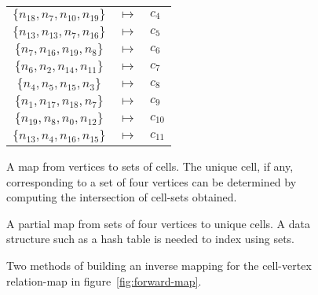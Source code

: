 \begin{figure}[H]
{\begin{tabular}{ccl}
$\{n_{18},n_{7},n_{10},n_{19}\}$ & $\mapsto$ & $c_{4}$ \\
$\{n_{13},n_{13},n_{7},n_{16}\}$ & $\mapsto$ & $c_{5}$ \\
$\{n_{7},n_{16},n_{19},n_{8}\}$ & $\mapsto$ & $c_{6}$ \\
$\{n_{6},n_{2},n_{14},n_{11}\}$ & $\mapsto$ & $c_{7}$ \\
$\{n_{4},n_{5},n_{15},n_{3}\}$ & $\mapsto$ & $c_{8}$ \\
$\{n_{1},n_{17},n_{18},n_{7}\}$ & $\mapsto$ & $c_{9}$ \\
$\{n_{19},n_{8},n_{0},n_{12}\}$ & $\mapsto$ & $c_{10}$ \\
$\{n_{13},n_{4},n_{16},n_{15}\}$ & $\mapsto$ & $c_{11}$ \\
\end{tabular}
}
\sidebysidecaptions
{\caption{A map from vertices to sets of cells. The unique cell, if any, corresponding to a set of four vertices can be determined by computing the intersection of cell-sets obtained.}}
{\caption{A partial map from sets of four vertices to unique cells. A data structure such as a hash table is needed to index using sets.}}

\caption{Two methods of building an inverse mapping for the cell-vertex relation-map in figure~\ref{fig:forward-map}.}
\label{fig:inverse-maps}
\end{figure}












